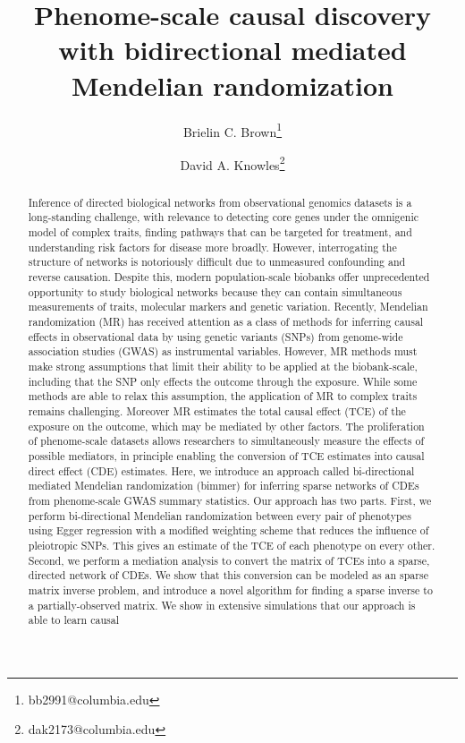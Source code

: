 \documentclass{article}
\title{Phenome-scale causal discovery with
bidirectional mediated Mendelian randomization}
\author[1, 2]{Brielin C. Brown\thanks{bb2991@columbia.edu}}
\author[2, 3, 4]{David A. Knowles\thanks{dak2173@columbia.edu}}
\affil[1]{Data Science Institute, Columbia University, New York, NY}
\affil[2]{New York Genome Center, New York, NY}
\affil[3]{Department of Computer Science, Columbia University, New York, NY}
\affil[4]{Department of Systems Biology, Columbia University, New York, NY}
\date{}
\begin{document}
\maketitle

\begin{abstract}
Inference of directed biological networks from observational
genomics datasets is a long-standing challenge, with relevance to detecting
core genes under the omnigenic model of complex traits, finding pathways that
can be targeted for treatment, and understanding risk
factors for disease more broadly. However, interrogating the structure of networks is notoriously difficult
due to unmeasured confounding and reverse causation.
Despite this, modern population-scale biobanks  offer unprecedented opportunity to study biological networks
 because they can contain simultaneous measurements of
traits, molecular markers and genetic variation. Recently, Mendelian randomization
(MR) has received attention as a class of methods for inferring causal effects
in observational data by using genetic variants (SNPs) from genome-wide
association studies (GWAS) as instrumental variables. However,
MR methods must make strong assumptions that limit their
ability to be applied at the biobank-scale, including that
the SNP only effects the outcome through the exposure.
While some methods are able to relax this assumption, the application of MR
to complex traits remains challenging. Moreover MR estimates the
total causal effect (TCE) of the exposure on the outcome, which may be mediated by other factors.
The proliferation of phenome-scale datasets
allows researchers to simultaneously measure the effects of possible mediators,
in principle enabling the conversion of TCE estimates into causal direct effect (CDE) 
estimates.
Here, we introduce an approach called
bi-directional mediated Mendelian randomization (bimmer)
for inferring sparse networks of CDEs from phenome-scale
GWAS summary statistics.
Our approach has two parts. First, we perform bi-directional Mendelian randomization
between every pair of phenotypes using Egger regression with a
modified weighting scheme that reduces the influence of pleiotropic SNPs.
This gives an estimate of the TCE of each phenotype on every other.
Second, we perform a mediation analysis to convert the matrix
of TCEs into a sparse, directed network of CDEs.
We show that this conversion can be modeled as an sparse matrix inverse problem,
and introduce a novel algorithm for finding a sparse inverse to a partially-observed matrix.
We show in extensive simulations that our approach is able to learn causal

\end{abstract}
\end{document}
